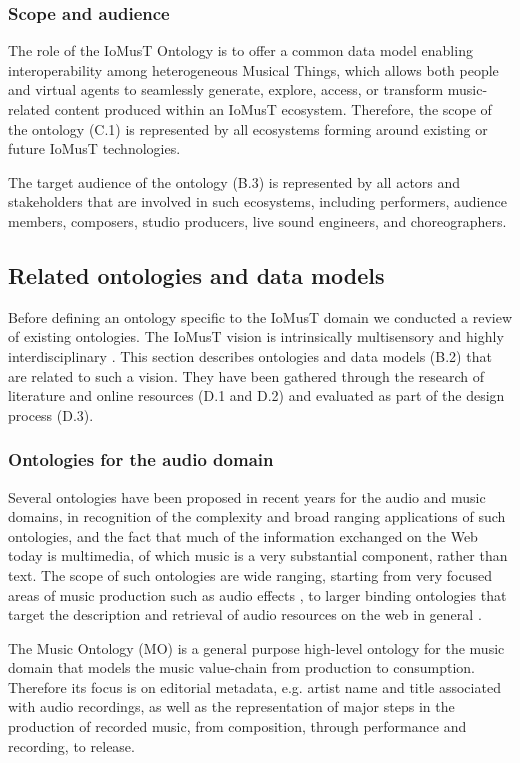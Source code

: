 \subsubsection{\textsf{Scope and audience}}
\label{ssec:audience_scope}
The role of the IoMusT Ontology is to offer a common data model enabling interoperability among heterogeneous Musical Things, which allows both people and virtual agents to seamlessly generate, explore, access, or transform music-related content produced within an IoMusT ecosystem. Therefore, the scope of the ontology (C.1) is represented by all ecosystems forming around existing or future IoMusT technologies.

The target audience of the ontology (B.3) is represented by all actors and stakeholders that are involved in such ecosystems, including performers, audience members, composers, studio producers, live sound engineers, and choreographers. 

\subsection{Related ontologies and data models}
\label{ssec:iomust_rw}
Before defining an ontology specific to the IoMusT domain we conducted a review of existing ontologies. The IoMusT vision is intrinsically multisensory and highly interdisciplinary \cite{turchet2018IoMusT}. This section describes ontologies and data models (B.2) that are related to such a vision. They have been gathered through the research of literature and online resources (D.1 and D.2) and evaluated as part of the design process (D.3).

\subsubsection{\textsf{Ontologies for the audio domain}}
Several ontologies have been proposed in recent years for the audio and music domains, in recognition of the complexity and broad ranging applications of such ontologies, and the fact that much of the information exchanged on the Web today is multimedia, of which music is a very substantial component, rather than text. The scope of such ontologies are wide ranging, starting from very focused areas of music production such as audio effects \cite{wilmering2013the}, to larger binding ontologies that target the description and retrieval of audio resources on the web in general \cite{ceriani2018audio}.

The Music Ontology (MO)  \cite{raimond2007music, raimond2010spec} is a general purpose high-level ontology for the music domain that models the music value-chain from production to consumption. Therefore its focus is on editorial metadata, e.g. artist name and title associated with audio recordings, as well as the representation of major steps in the production of recorded music, from composition, through performance and recording, to release.


